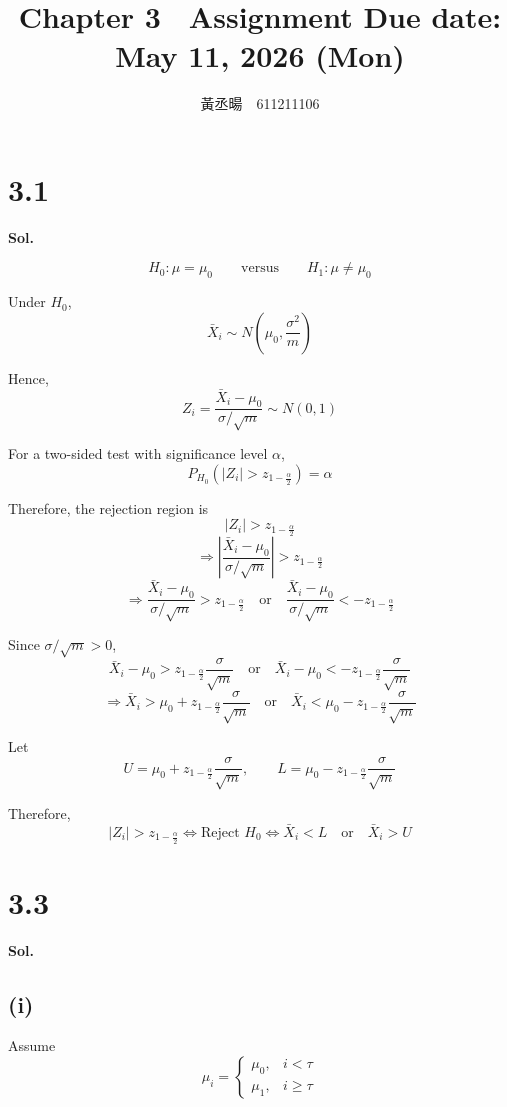 \documentclass[a4paper, 12pt]{article}  %
\title{Chapter 3　Assignment \small{Due date: May 11, 2026 (Mon)}}
\author{黃丞暘　611211106}
\date{}
\begin{document}
\maketitle %

\section*{3.1}
\textbf{Sol.}
    
$$
H_0:\mu=\mu_0
\qquad \text{versus} \qquad
H_1:\mu\neq \mu_0
$$

Under \(H_0\),
$$
\bar X_i \sim N\left(\mu_0,\frac{\sigma^2}{m}\right)
$$

Hence,
$$
Z_i=\frac{\bar X_i-\mu_0}{\sigma/\sqrt m}\sim N(0,1)
$$

For a two-sided test with significance level $\alpha$,
$$
P_{H_0}\left(|Z_i|>z_{1-\frac{\alpha}{2}}\right)=\alpha
$$

Therefore, the rejection region is
$$
|Z_i|>z_{1-\frac{\alpha}{2}}
$$
$$
\Rightarrow\left|\frac{\bar X_i-\mu_0}{\sigma/\sqrt m}\right|>z_{1-\frac{\alpha}{2}}
$$
$$
\Rightarrow
\frac{\bar X_i-\mu_0}{\sigma/\sqrt m}>z_{1-\frac{\alpha}{2}}
\quad
\text{or}
\quad
\frac{\bar X_i-\mu_0}{\sigma/\sqrt m}<-z_{1-\frac{\alpha}{2}}
$$

Since \(\sigma/\sqrt m>0\),
$$
\bar X_i-\mu_0>z_{1-\frac{\alpha}{2}}\frac{\sigma}{\sqrt m}
\quad
\text{or}
\quad
\bar X_i-\mu_0<-z_{1-\frac{\alpha}{2}}\frac{\sigma}{\sqrt m}
$$
$$
\Rightarrow
\bar X_i>\mu_0+z_{1-\frac{\alpha}{2}}\frac{\sigma}{\sqrt m}
\quad
\text{or}
\quad
\bar X_i<\mu_0-z_{1-\frac{\alpha}{2}}\frac{\sigma}{\sqrt m}
$$

Let
$$
U=\mu_0+z_{1-\frac{\alpha}{2}}\frac{\sigma}{\sqrt m},
\qquad
L=\mu_0-z_{1-\frac{\alpha}{2}}\frac{\sigma}{\sqrt m}
$$

Therefore,
$$
|Z_i|>z_{1-\frac{\alpha}{2}}
\iff
\text{Reject }H_0
\iff
\bar X_i<L
\quad \text{or} \quad
\bar X_i>U
$$

\section*{3.3}
\textbf{Sol.}
\subsection*{(i)}
Assume
$$
\mu_i=
\begin{cases}
\mu_0, & i<\tau \\
\mu_1, & i\ge \tau
\end{cases}
$$
\end{document}
